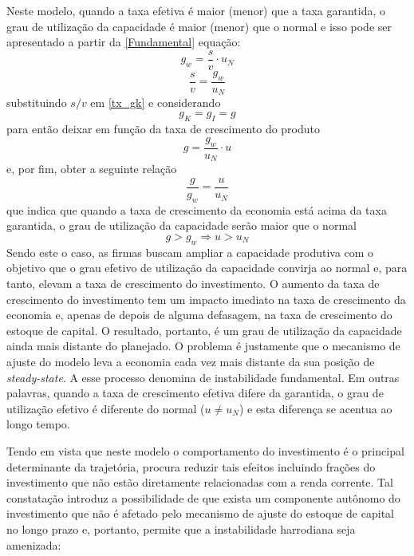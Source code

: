 Neste modelo, quando a taxa efetiva é maior (menor) que a taxa garantida, o grau de utilização da capacidade é maior (menor) que o normal e isso pode ser apresentado a partir da \ref{Fundamental} equação:
$$
g_w = \frac{s}{v}\cdot u_N
$$
$$
\frac{s}{v} = \frac{g_w}{u_N}
$$
substituindo  $s/v$ em \ref{tx_gk} e considerando
$$
g_K = g_I = g
$$ 
para então deixar em função da taxa de crescimento do produto
$$
g = \frac{g_w}{u_N}\cdot u
$$
e, por fim, obter a seguinte relação
$$
\frac{g}{g_w} = \frac{u}{u_N}
$$
que indica que quando a taxa de crescimento da economia está acima da taxa garantida, o grau de utilização da capacidade serão maior que o normal
$$
g > g_w \Rightarrow u > u_N
$$
Sendo este o caso, as firmas buscam ampliar a capacidade produtiva com o objetivo que o grau efetivo de utilização da capacidade convirja ao normal e, para tanto, elevam a taxa de crescimento do investimento. O aumento da taxa de crescimento do investimento tem um impacto imediato na taxa de crescimento da
economia e, apenas de depois de alguma defasagem, na taxa de crescimento do estoque de capital. O resultado, portanto, é um grau de utilização da capacidade ainda mais distante do planejado. O problema é justamente que o mecanismo de ajuste do modelo leva a economia cada vez mais distante da sua posição de \textit{steady-state}. A esse processo \textcite{harrod_essay_1939} denomina de instabilidade fundamental. Em outras palavras, quando a taxa de crescimento efetiva difere  da garantida, o grau de utilização efetivo é diferente do normal ($u\neq u_N$) e esta diferença se acentua ao longo tempo.






Tendo em vista que neste modelo o comportamento do investimento é o principal determinante da trajetória, \textcite[p.~26--28]{harrod_essay_1939} procura reduzir tais efeitos incluindo frações do investimento que não estão diretamente relacionadas com a renda corrente. Tal constatação introduz a possibilidade de que exista um componente autônomo do investimento que não é afetado pelo mecanismo de ajuste do estoque de capital no longo prazo e, portanto, permite que a instabilidade harrodiana seja amenizada:

